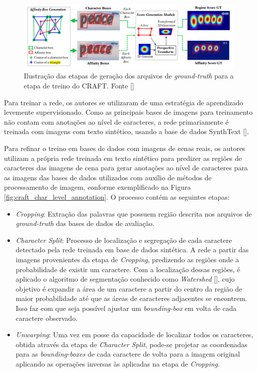 \begin{figure}
    \centering
    \includegraphics[width=\textwidth]{figs/craft-gt.png}
    \caption{Ilustração das etapas de geração dos arquivos de \textit{ground-truth} para a etapa de treino do CRAFT. Fonte []}
    \label{fig:craft_gt}
\end{figure}

Para treinar a rede, os autores se utilizaram de uma estratégia de aprendizado levemente supervisionado. Como as principais bases de imagens para 
treinamento não contam com anotações ao nível de caracteres, a rede primariamente é treinada com imagens com texto sintético, usando a base de dados 
SynthText [].

Para refinar o treino em bases de dados com imagens de cenas reais, os autores utilizam a própria rede treinada em texto sintético para predizer 
as regiões de caracteres das imagens de cena para gerar anotações ao nível de caracteres para as imagens das bases de dados utilizados com auxílio 
de métodos de processamento de imagem, conforme exemplificado na Figura \ref{fig:craft_char_level_annotation}. O processo contém as seguintes etapas:

\begin{itemize}
    \item \textit{Cropping}: Extração das palavras que possuem região descrita nos arquivos de \textit{ground-truth} das bases de dados de avaliação.

    \item \textit{Character Split}: Processo de localização e segregação de cada caractere detectado pela rede treinada em base de dados sintética. 
    A rede a partir das imagens provenientes da etapa de \textit{Cropping}, predizendo as regiões onde a probabilidade de existir um caractere. 
    Com a localização dessas regiões, é aplicado o algoritmo de segmentação conhecido como \textit{Watershed} [], 
    cujo objetivo é expandir a área de um caractere a partir do centro da região de maior probabilidade até que as áreas de caracteres adjacentes se 
    encontrem. Isso faz com que seja possível ajustar um \textit{bounding-box} em volta de cada caractere observado.

    \item \textit{Unwarping}: Uma vez em posse da capacidade de localizar todos os caracteres, obtida através da etapa de \textit{Character Split}, 
    pode-se projetar as coordenadas para as \textit{bounding-boxes} de cada caractere de volta para a imagem original aplicando as operações inversas 
    às aplicadas na etapa de \textit{Cropping}.
\end{itemize}

